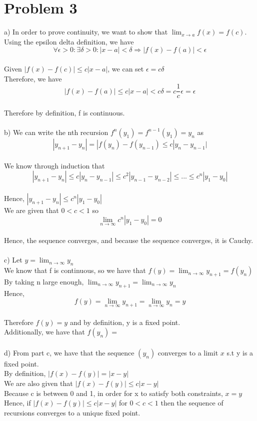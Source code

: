 \documentclass{article}
\begin{document}
\section*{Problem 3}
a) In order to prove continuity, we want to show that $\lim_{x \to a}f(x) = f(c)$.
\\Using the epsilon delta definition, we have $$\forall \epsilon > 0 : \exists \delta > 0 : |x - a| < \delta \Rightarrow |f(x) - f(a)| < \epsilon$$
\\Given $|f(x) - f(c)| \leq c|x - a|$, we can set $\epsilon = c\delta$
\\Therefore, we have $$|f(x) - f(a)| \leq c|x - a| < c\delta = c\frac{1}{c}\epsilon = \epsilon$$
\\Therefore by definition, f is continuous.
\\
\\b) We can write the nth recursion $f^n(y_1) = f^{n-1}(y_1) = y_n$ as $$|y_{n+1} - y_n| = |f(y_n) - f(y_{n-1}) \leq c|y_n - y_{n-1}|$$
\\We know through induction that $$|y_{n+1} - y_n| \leq c|y_n - y_{n-1}| \leq c^2|y_{n-1} - y_{n-2}| \leq ... \leq c^n|y_1 - y_0|$$
\\Hence, $|y_{n+1} - y_n| \leq c^n|y_1 - y_0|$
\\We are given that $0 < c < 1$ so $$\lim_{n \to \infty} c^n|y_1 - y_0| = 0$$
\\Hence, the sequence converges, and because the sequence converges, it is Cauchy.
\\
\\c) Let $y = \lim_{n \to \infty} y_n$
\\We know that f is continuous, so we have that $f(y) = \lim_{n \to \infty} y_{n+1} = f(y_n)$
\\By taking n large enough, $\lim_{n \to \infty} y_{n+1} = \lim_{n \to \infty} y_n$
\\Hence, $$f(y) = \lim_{n \to \infty} y_{n+1} = \lim_{n \to \infty} y_n = y$$
\\Therefore $f(y) = y$ and by definition, y is a fixed point.
\\Additionally, we have that $f(y_n) = $
\\
\\d) From part c, we have that the sequence $(y_n)$ converges to a limit $x$ s.t y is a fixed point.
\\By definition, $|f(x) - f(y)| = |x - y|$
\\We are also given that $|f(x) - f(y)| \leq c|x - y|$
\\Because c is between 0 and 1, in order for x to satisfy both constraints, $x = y$
\\Hence, if $|f(x) - f(y)| \leq c|x - y|$ for $0 < c < 1$ then the sequence of recursions converges to a unique fixed point.
\end{document}
